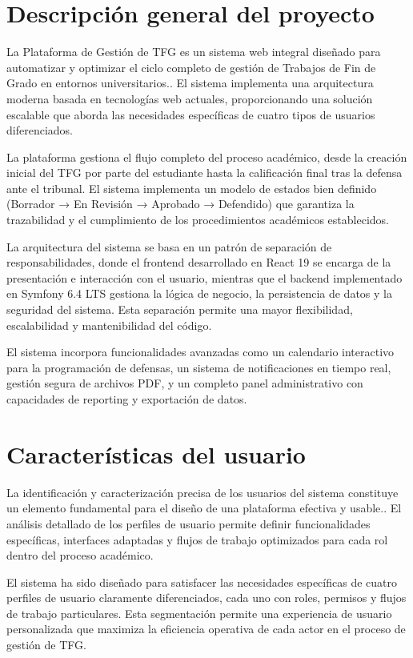 \documentclass[12pt,a4paper,oneside]{report}
\begin{document}
\section{Descripción general del
proyecto}\label{descripciuxf3n-general-del-proyecto}

La Plataforma de Gestión de TFG es un sistema web integral diseñado para
automatizar y optimizar el ciclo completo de gestión de Trabajos de Fin
de Grado en entornos universitarios.. El sistema implementa una
arquitectura moderna basada en tecnologías web actuales, proporcionando
una solución escalable que aborda las necesidades específicas de cuatro
tipos de usuarios diferenciados.

La plataforma gestiona el flujo completo del proceso académico, desde la
creación inicial del TFG por parte del estudiante hasta la calificación
final tras la defensa ante el tribunal. El sistema implementa un modelo
de estados bien definido (Borrador → En Revisión → Aprobado → Defendido)
que garantiza la trazabilidad y el cumplimiento de los procedimientos
académicos establecidos.

La arquitectura del sistema se basa en un patrón de separación de
responsabilidades, donde el frontend desarrollado en React 19 se encarga
de la presentación e interacción con el usuario, mientras que el backend
implementado en Symfony 6.4 LTS gestiona la lógica de negocio, la
persistencia de datos y la seguridad del sistema. Esta separación
permite una mayor flexibilidad, escalabilidad y mantenibilidad del
código.

El sistema incorpora funcionalidades avanzadas como un calendario
interactivo para la programación de defensas, un sistema de
notificaciones en tiempo real, gestión segura de archivos PDF, y un
completo panel administrativo con capacidades de reporting y exportación
de datos.

\section{Características del
usuario}\label{caracteruxedsticas-del-usuario}

La identificación y caracterización precisa de los usuarios del sistema
constituye un elemento fundamental para el diseño de una plataforma
efectiva y usable.. El análisis detallado de los perfiles de usuario
permite definir funcionalidades específicas, interfaces adaptadas y
flujos de trabajo optimizados para cada rol dentro del proceso
académico.

El sistema ha sido diseñado para satisfacer las necesidades específicas
de cuatro perfiles de usuario claramente diferenciados, cada uno con
roles, permisos y flujos de trabajo particulares. Esta segmentación
permite una experiencia de usuario personalizada que maximiza la
eficiencia operativa de cada actor en el proceso de gestión de TFG.
\end{document}
